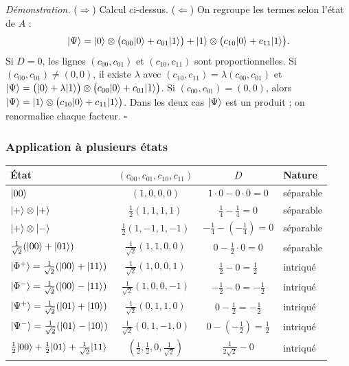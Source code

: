 \emph{Démonstration.} ($\Rightarrow$) Calcul ci-dessus. ($\Leftarrow$) On regroupe les
termes selon l'état de $A$ :
\[
  |\Psi\rangle=|0\rangle\otimes\big(c_{00}|0\rangle+c_{01}|1\rangle\big)+|1\rangle\otimes\big(c_{10}|0\rangle+c_{11}|1\rangle\big).
\]
Si $D=0$, les lignes $(c_{00},c_{01})$ et $(c_{10},c_{11})$ sont proportionnelles. Si
$(c_{00},c_{01})\neq(0,0)$, il existe $\lambda$ avec $(c_{10},c_{11})=\lambda(c_{00},c_{01})$
et $|\Psi\rangle=\big(|0\rangle+\lambda|1\rangle\big)\otimes\big(c_{00}|0\rangle+c_{01}|1\rangle\big)$.
Si $(c_{00},c_{01})=(0,0)$, alors $|\Psi\rangle=|1\rangle\otimes\big(c_{10}|0\rangle+c_{11}|1\rangle\big)$.
Dans les deux cas $|\Psi\rangle$ est un produit ; on renormalise chaque facteur.
\hfill$\square$

\subsubsection{Application à plusieurs états}

\begin{center}
\renewcommand{\arraystretch}{1.5}
\begin{tabular}{@{}lccl@{}}
\toprule
\textbf{État} & $(c_{00},c_{01},c_{10},c_{11})$ & $D$ & \textbf{Nature} \\
\midrule
$|00\rangle$ & $(1,0,0,0)$ & $1\cdot0-0\cdot0=0$ & séparable \\
$|+\rangle\otimes|+\rangle$ & $\frac12(1,1,1,1)$ & $\frac14-\frac14=0$ & séparable \\
$|+\rangle\otimes|-\rangle$ & $\frac12(1,-1,1,-1)$ & $-\frac14-(-\frac14)=0$ & séparable \\
$\frac{1}{\sqrt2}(|00\rangle+|01\rangle)$ & $\frac{1}{\sqrt2}(1,1,0,0)$ & $0-\frac12\cdot0=0$ & séparable \\
$|\Phi^+\rangle=\frac{1}{\sqrt2}(|00\rangle+|11\rangle)$ & $\frac{1}{\sqrt2}(1,0,0,1)$ & $\frac12-0=\frac12$ & intriqué \\
$|\Phi^-\rangle=\frac{1}{\sqrt2}(|00\rangle-|11\rangle)$ & $\frac{1}{\sqrt2}(1,0,0,-1)$ & $-\frac12-0=-\frac12$ & intriqué \\
$|\Psi^+\rangle=\frac{1}{\sqrt2}(|01\rangle+|10\rangle)$ & $\frac{1}{\sqrt2}(0,1,1,0)$ & $0-\frac12=-\frac12$ & intriqué \\
$|\Psi^-\rangle=\frac{1}{\sqrt2}(|01\rangle-|10\rangle)$ & $\frac{1}{\sqrt2}(0,1,-1,0)$ & $0-(-\frac12)=\frac12$ & intriqué \\
$\frac12|00\rangle+\frac12|01\rangle+\frac{1}{\sqrt2}|11\rangle$ & $(\frac12,\frac12,0,\frac{1}{\sqrt2})$ & $\frac{1}{2\sqrt2}-0$ & intriqué \\
\bottomrule
\end{tabular}
\end{center}

